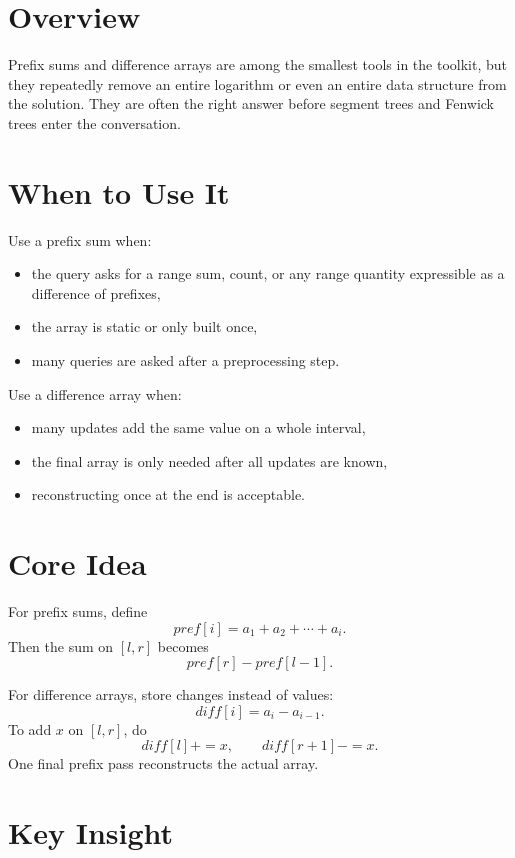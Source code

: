 \section*{Overview}

Prefix sums and difference arrays are among the smallest tools in the toolkit, but they repeatedly remove an entire
logarithm or even an entire data structure from the solution. They are often the right answer before segment trees and
Fenwick trees enter the conversation.

\section*{When to Use It}

Use a prefix sum when:

\begin{itemize}
  \item the query asks for a range sum, count, or any range quantity expressible as a difference of prefixes,
  \item the array is static or only built once,
  \item many queries are asked after a preprocessing step.
\end{itemize}

Use a difference array when:

\begin{itemize}
  \item many updates add the same value on a whole interval,
  \item the final array is only needed after all updates are known,
  \item reconstructing once at the end is acceptable.
\end{itemize}

\section*{Core Idea}

For prefix sums, define
\[
pref[i] = a_1 + a_2 + \cdots + a_i.
\]
Then the sum on \([l, r]\) becomes
\[
pref[r] - pref[l - 1].
\]

For difference arrays, store changes instead of values:
\[
diff[i] = a_i - a_{i-1}.
\]
To add \(x\) on \([l, r]\), do
\[
diff[l] += x, \qquad diff[r + 1] -= x.
\]
One final prefix pass reconstructs the actual array.

\section*{Key Insight}

